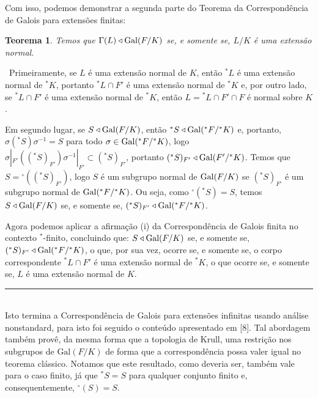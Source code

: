 \documentclass[12pt,a4paper]{article}
\newtheorem{thrm}[mydef]{Teorema}
\def\dem{\par\smallbreak\noindent {\textit{ Demonstração:}} \ }
\def\eop{\hfill\rule{2.5mm}{2.5mm} \\ }
\theoremstyle{definition}
\begin{document}
Com isso, podemos demonstrar a segunda parte do Teorema da Correspondência de Galois para extensões finitas:

\begin{thrm}

    Temos que $\Gamma(L)\triangleleft \text{\upshape Gal\itshape}(F/K)$ se, e somente se, $L/K$ é uma extensão normal.

\end{thrm}

\dem Primeiramente, se $L$ é uma extensão normal de $K$, então $^*L$ é uma extensão normal de $^*K$, portanto $^*L\cap F'$ é uma extensão normal de $^*K$ e, por outro lado, se $^*L\cap F'$ é uma extensão normal de $^*K$, então $L={^*L\cap F'}\cap F$ é normal sobre $K$. 

Em segundo lugar, se $S \triangleleft \text{\upshape Gal\itshape}(F/K)$, então $^*S\triangleleft  \text{\upshape Gal\itshape}({^*F}/{^*K})$ e, portanto, $\sigma ({^*S}) \sigma^{-1}=S$ para todo $\sigma \in  \text{\upshape Gal\itshape}({^*F}/{^*K})$, logo $\sigma|_{F'} (({^*S})_{F'}) \sigma^{-1}|_{F'}  \subset ({^*S})_{F'}$, portanto $({^*S})_{F'}\triangleleft \text{\upshape Gal\itshape}(F'/{^*K})$. Temos que $S={^\circ(({^*S})_{F'})}$, logo $S$ é um subgrupo normal de $ \text{\upshape Gal\itshape}(F/K)$ se $({^*S})_{F'}$ é um subgrupo normal de $\text{\upshape Gal\itshape}({^*F}/{^*K})$. Ou seja, como $^\circ({^*S})=S$, temos $S\triangleleft \text{\upshape Gal\itshape}(F/K)$ se, e somente se, $({^*S})_{F'} \triangleleft \text{\upshape Gal\itshape}({^*F}/{^*K})$. 

Agora podemos aplicar a afirmação (i) da Correspondência de Galois finita no contexto $^*$-finito, concluindo que: $S\triangleleft \text{\upshape Gal\itshape}(F/K)$ se, e somente se, $({^*S})_{F'} \triangleleft \text{\upshape Gal\itshape}({^*F}/{^*K})$, o que, por sua vez, ocorre se, e somente se, o corpo correspondente $^*L\cap F'$ é uma extensão normal de $^*K$, o que ocorre se, e somente se, $L$ é uma extensão normal de $K$. \eop       


Isto termina a Correspondência de Galois para extensões infinitas usando análise nonstandard, para isto foi seguido o conteúdo apresentado em [8]. Tal abordagem também provê, da mesma forma que a topologia de Krull, uma restrição nos subgrupos de $\text{Gal}(F/K)$ de forma que a correspondência possa valer igual no teorema clássico. Notamos que este resultado, como deveria ser, também vale para o caso finito, já que ${^*S}=S$ para qualquer conjunto finito e, consequentemente, $^\circ({S})=S$.
\end{document}
